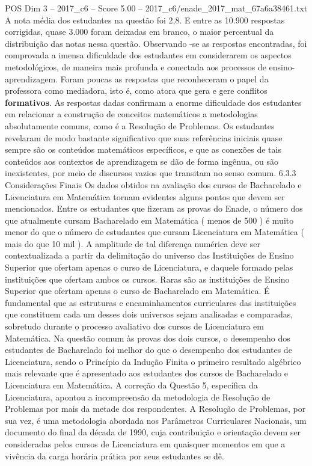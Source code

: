 \begin{textsample}{POS Dim 3 – 2017\_c6 – Score 5.00 – 2017\_c6/enade\_2017\_mat\_67a6a38461.txt}
A nota média dos estudantes na questão foi 2,8.
E entre as 10.900 respostas corrigidas, quase 3.000 foram deixadas em branco, o maior percentual da distribuição das notas nessa questão.
Observando -se as respostas encontradas, foi comprovada a imensa dificuldade dos estudantes em considerarem os aspectos metodológicos, de maneira mais profunda e conectada aos processos de ensino-aprendizagem.
Foram poucas as respostas que reconheceram o papel da professora como mediadora, isto é, como atora que gera e gere conflitos \textbf{formativos}.
As respostas dadas confirmam a enorme dificuldade dos estudantes em relacionar a construção de conceitos matemáticos a metodologias absolutamente comuns, como é a Resolução de Problemas.
Os estudantes revelaram de modo bastante significativo que suas referências iniciais quase sempre são os conteúdos matemáticos específicos, e que as conexões de tais conteúdos aos contextos de aprendizagem se dão de forma ingênua, ou são inexistentes, por meio de discursos vazios que transitam no senso comum. 6.3.3 Considerações Finais Os dados obtidos na avaliação dos cursos de Bacharelado e Licenciatura em Matemática tornam evidentes alguns pontos que devem ser mencionados.
Entre os estudantes que fizeram as provas do Enade, o número dos que atualmente cursam Bacharelado em Matemática ( menos de 500 ) é muito menor do que o número de estudantes que cursam Licenciatura em Matemática ( mais do que 10 mil ).
A amplitude de tal diferença numérica deve ser contextualizada a partir da delimitação do universo das Instituições de Ensino Superior que ofertam apenas o curso de Licenciatura, e daquele formado pelas instituições que ofertam ambos os cursos.
Raras são as instituições de Ensino Superior que ofertam apenas o curso de Bacharelado em Matemática.
É fundamental que as estruturas e encaminhamentos curriculares das instituições que constituem cada um desses dois universos sejam analisadas e comparadas, sobretudo durante o processo avaliativo dos cursos de Licenciatura em Matemática.
Na questão comum às provas dos dois cursos, o desempenho dos estudantes de Bacharelado foi melhor do que o desempenho dos estudantes de Licenciatura, sendo o Princípio da Indução Finita o primeiro resultado algébrico mais relevante que é apresentado aos estudantes dos cursos de Bacharelado e Licenciatura em Matemática.
A correção da Questão 5, específica da Licenciatura, apontou a incompreensão da metodologia de Resolução de Problemas por mais da metade dos respondentes.
A Resolução de Problemas, por sua vez, é uma metodologia abordada nos Parâmetros Curriculares Nacionais, um documento do final da década de 1990, cuja contribuição e orientação devem ser consideradas pelos cursos de Licenciatura em quaisquer momentos em que a vivência da carga horária prática por seus estudantes se dê.

\end{textsample}
